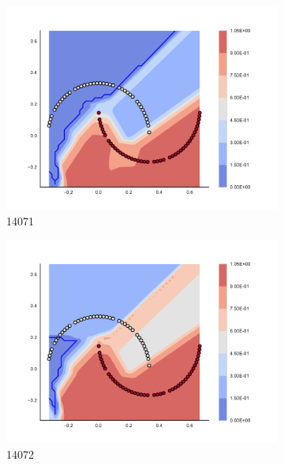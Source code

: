         \begin{figure}[h]\ContinuedFloat
        
\begin{subfigure}[b]{0.09\textwidth}
    \includegraphics[clip, trim=2.35cm 1.75cm 4.5cm 0cm,width=\textwidth]{img/convergence/14071.pdf}
    \caption{14071}
    \label{fig:convergence_14071}
\end{subfigure}
%
\begin{subfigure}[b]{0.09\textwidth}
    \includegraphics[clip, trim=2.35cm 1.75cm 4.5cm 0cm,width=\textwidth]{img/convergence/14072.pdf}
    \caption{14072}
    \label{fig:convergence_14072}
\end{subfigure}
%
\begin{subfigure}[b]{0.09\textwidth}

\end{subfigure}
\end{figure}
